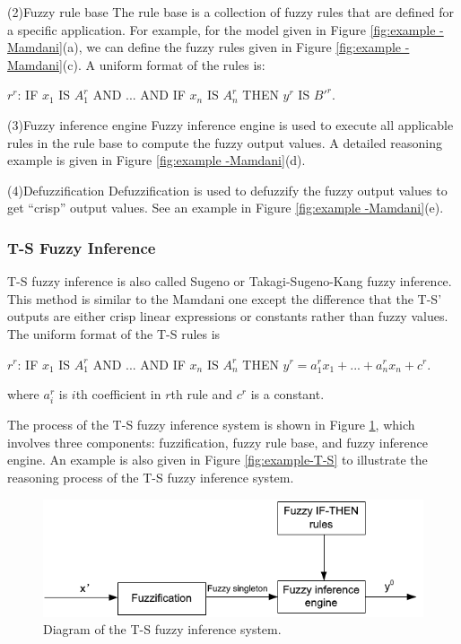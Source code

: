 \documentclass[journal,a4paper,onecolumn]{article}
\begin{document}
(2)Fuzzy rule base
The rule base is a collection of fuzzy rules that are defined for a specific application. 
For example, for the model given in Figure \ref{fig:example -Mamdani}(a), we can define the fuzzy rules given in Figure \ref{fig:example -Mamdani}(c).
A uniform format of the rules is:
\begin{center}
$r^r$: IF $x_1$ IS $A^r_1$ AND ... AND IF $x_n$ IS $A^r_n$ THEN $y^r$ IS ${B'}^r$.
\end{center}

(3)Fuzzy inference engine
Fuzzy inference engine is used to execute all applicable rules in the rule base to compute the fuzzy output values.
A detailed reasoning example is given in Figure \ref{fig:example -Mamdani}(d).

(4)Defuzzification
Defuzzification is used to defuzzify the fuzzy output values to get ``crisp'' output values.
See an example in Figure \ref{fig:example -Mamdani}(e).
 



\clearpage
\subsubsection{T-S Fuzzy Inference}

T-S fuzzy inference \cite{TS85} is also called Sugeno or Takagi-Sugeno-Kang fuzzy inference. This method is similar to the Mamdani one except the difference that the T-S' outputs are either crisp linear expressions or constants rather than fuzzy values. 
The uniform format of the T-S rules is
\begin{center}
	$r^r$: IF $x_1$ IS $A^r_1$ AND ... AND IF $x_n$ IS $A^r_n$ THEN $y^r=a^r_1x_1+...+a^r_nx_n+c^r$.
\end{center}
where $a^r_i$ is $i$th coefficient in $r$th rule and $c^r$ is a constant. 

The process of the T-S fuzzy inference system is shown in Figure \ref{fig:diagram-T-S}, which involves three components: fuzzification, fuzzy rule base, and fuzzy inference engine. An example is also given in Figure \ref{fig:example-T-S} to illustrate the reasoning process of the T-S fuzzy inference system.

\begin{figure}[!hbt]
	\begin{center}
		\includegraphics[width=0.7\columnwidth]{fig49}
		\caption{Diagram of the T-S fuzzy inference system.}
		\label{fig:diagram-T-S}
	\end{center}
\end{figure}
\end{document}
